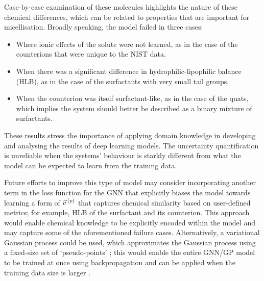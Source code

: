 Case-by-case examination of these molecules highlights the nature of these chemical
differences, which can be related to properties that are important for micellisation.
Broadly speaking, the model failed in three cases:
\begin{itemize}
    \item Where ionic effects of the solute were not learned, as in the case of the counterions that were unique to the NIST data.
    \item When there was a significant difference in hydrophilic-lipophilic balance (HLB), as in the case of the surfactants with very small tail groups.
    \item When the counterion was itself surfactant-like, as in the case of the
          quats, which implies the system should better be described as a binary
          mixture of surfactants.
\end{itemize}
These results stress the importance of applying domain knowledge in developing
and analysing the results of deep learning models. The uncertainty
quantification is unreliable when the systems' behaviour is starkly different
from what the model can be expected to learn from the training data.

Future efforts to improve this type of model may consider incorporating another
term in the loss function for the GNN that explicitly biases the model towards
learning a form of $\vec{v}^{\,(p)}{}$ that captures chemical similarity based on
user-defined metrics; for example, HLB of the surfactant and its counterion.
This approach would enable chemical knowledge to be explicitly encoded within
the model and may capture some of the aforementioned failure cases.
Alternatively, a variational Gaussian process could be used, which approximates
the Gaussian process using a fixed-size set of `pseudo-points'
\cite{hensmanGaussianProcessesBig2013}; this would enable the entire GNN/GP
model to be trained at once using backpropagation and can be applied when the
training data size is larger
\cite{moriartyUnlockNNUncertaintyQuantification2022}.